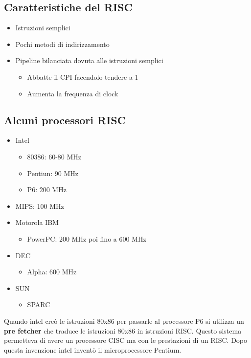 \documentclass[a4paper]{article}
\theoremstyle{break}
\theoremstyle{break}
\theoremstyle{break}
\theoremstyle{break}
\begin{document}
\subsection{Caratteristiche del RISC}
\begin{itemize}
  \item Istruzioni semplici
  \item Pochi metodi di indirizzamento
  \item Pipeline bilanciata dovuta alle istruzioni semplici
    \begin{itemize}
      \item Abbatte il CPI facendolo tendere a 1
      \item Aumenta la frequenza di clock
    \end{itemize}
\end{itemize}

\subsection{Alcuni processori RISC}
\begin{itemize}
  \item Intel
    \begin{itemize}
      \item 80386: 60-80 MHz
      \item Pentiun: 90 MHz
      \item P6: 200 MHz
    \end{itemize}
  \item MIPS: 100 MHz
  \item Motorola IBM
    \begin{itemize}
      \item PowerPC: 200 MHz poi fino a 600 MHz
    \end{itemize}
  \item DEC
    \begin{itemize}
      \item Alpha: 600 MHz
    \end{itemize}
  \item SUN
    \begin{itemize}
      \item SPARC
    \end{itemize}
\end{itemize}

Quando intel creò le istruzioni 80x86 per passarle al processore P6 si utilizza
un \textbf{pre fetcher} che traduce le istruzioni 80x86 in istruzioni RISC.
Questo sistema permetteva di avere un processore CISC ma con le prestazioni di
un RISC. Dopo questa invenzione intel inventò il microprocessore Pentium.
\end{document}
